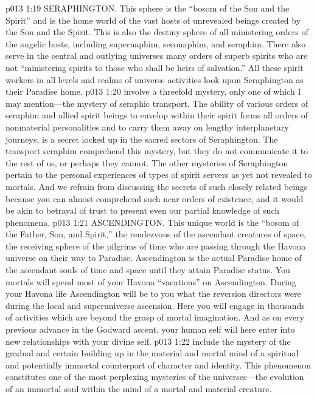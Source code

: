 \pc \vs p013 1:19 \bibnobreakspace SERAPHINGTON. This sphere is the “bosom of the Son and the Spirit” and is the home world of the vast hosts of unrevealed beings created by the Son and the Spirit. This is also the destiny sphere of all ministering orders of the angelic hosts, including supernaphim, seconaphim, and seraphim. There also serve in the central and outlying universes many orders of superb spirits who are not “ministering spirits to those who shall be heirs of salvation.” All these spirit workers in all levels and realms of universe activities look upon Seraphington as their Paradise home.
\pc \vs p013 1:20  involve a threefold mystery, only one of which I may mention---the mystery of seraphic transport. The ability of various orders of seraphim and allied spirit beings to envelop within their spirit forms all orders of nonmaterial personalities and to carry them away on lengthy interplanetary journeys, is a secret locked up in the sacred sectors of Seraphington. The transport seraphim comprehend this mystery, but they do not communicate it to the rest of us, or perhaps they cannot. The other mysteries of Seraphington pertain to the personal experiences of types of spirit servers as yet not revealed to mortals. And we refrain from discussing the secrets of such closely related beings because you can almost comprehend such near orders of existence, and it would be akin to betrayal of trust to present even our partial knowledge of such phenomena.
\pc \vs p013 1:21 \bibnobreakspace ASCENDINGTON. This unique world is the “bosom of the Father, Son, and Spirit,” the rendezvous of the ascendant creatures of space, the receiving sphere of the pilgrims of time who are passing through the Havona universe on their way to Paradise. Ascendington is the actual Paradise home of the ascendant souls of time and space until they attain Paradise status. You mortals will spend most of your Havona “vacations” on Ascendington. During your Havona life Ascendington will be to you what the reversion directors were during the local and superuniverse ascension. Here you will engage in thousands of activities which are beyond the grasp of mortal imagination. And as on every previous advance in the Godward ascent, your human self will here enter into new relationships with your divine self.
\pc \vs p013 1:22  include the mystery of the gradual and certain building up in the material and mortal mind of a spiritual and potentially immortal counterpart of character and identity. This phenomenon constitutes one of the most perplexing mysteries of the universes---the evolution of an immortal soul within the mind of a mortal and material creature.
